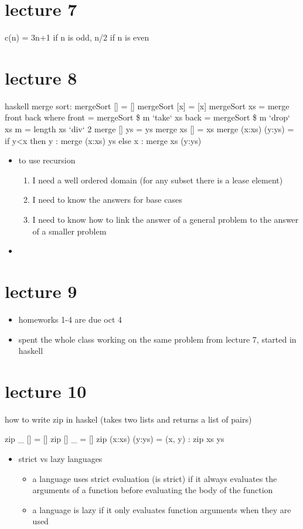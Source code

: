\documentclass[11pt]{article}
\begin{document}
\section{lecture 7}
\label{sec-6}
c(n) = 3n+1 if n is odd, n/2 if n is even
\section{lecture 8}
\label{sec-7}
haskell merge sort:
mergeSort [] = []
mergeSort [x] = [x]
mergeSort xs = merge front back where
     front = mergeSort \$ m `take` xs 
     back = mergeSort \$ m `drop` xs
     m = length xs `div` 2
     merge [] ys = ys
     merge xs [] = xs
     merge (x:xs) (y:ys) =
         if y<x
         then y : merge (x:xs) ys
         else x : merge xs (y:ys)

\begin{itemize}
\item to use recursion
\begin{enumerate}
\item I need a well ordered domain (for any subset there is a lease element)
\item I need to know the answers for base cases
\item I need to know how to link the answer of a general problem to the answer of a smaller problem
\end{enumerate}
\item 
\end{itemize}
\section{lecture 9}
\label{sec-8}
\begin{itemize}
\item homeworks 1-4 are due oct 4
\item spent the whole class working on the same problem from lecture 7, started in haskell
\end{itemize}
\section{lecture 10}
\label{sec-9}
how to write zip in haskel (takes two lists and returns a list of pairs)

zip \_ [] = []
zip [] \_ = []
zip (x:xs) (y:ys) = (x, y) : zip xs ys

\begin{itemize}
\item strict vs lazy languages
\begin{itemize}
\item a language uses strict evaluation (is strict) if it always evaluates the arguments of a function 
before evaluating the body of the function
\item a language is lazy if it  only evaluates function arguments when they are used
\end{itemize}
\end{itemize}
\end{document}
